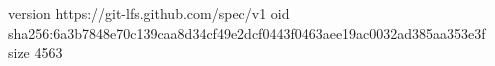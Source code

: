 version https://git-lfs.github.com/spec/v1
oid sha256:6a3b7848e70c139caa8d34cf49e2dcf0443f0463aee19ac0032ad385aa353e3f
size 4563
